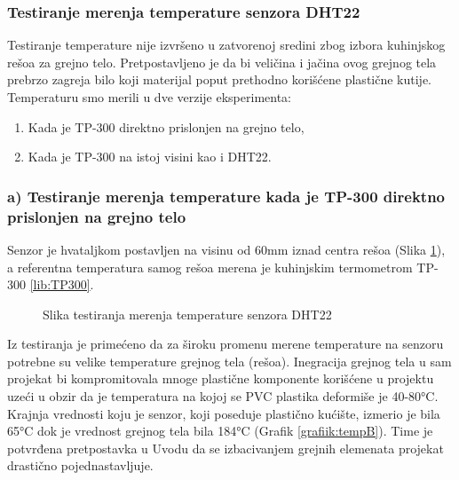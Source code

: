 \documentclass[a4paper, 12pt]{article}
\begin{document}
\pagebreak

		\subsubsection*{Testiranje merenja temperature senzora DHT22}

\vspace{10pt}		
		
Testiranje temperature nije izvršeno u zatvorenoj sredini zbog izbora kuhinjskog rešoa za grejno telo. Pretpostavljeno je da bi veličina i jačina ovog grejnog tela prebrzo zagreja bilo koji materijal poput prethodno korišćene plastične kutije. Temperaturu smo merili u dve verzije eksperimenta:
	
	\begin{enumerate}[label={\alph*)}]
		\item Kada je TP-300 direktno prislonjen na grejno telo,
		\item Kada je TP-300 na istoj visini kao i DHT22.
	\end{enumerate}


		\subsubsection*{a) Testiranje merenja temperature kada je TP-300 direktno prislonjen na grejno telo}

Senzor je hvataljkom postavljen na visinu od 60mm iznad centra rešoa (Slika \ref{fig:testTempA}), a referentna temperatura samog rešoa merena je kuhinjskim termometrom TP-300 \ref{lib:TP300}.

\vspace{10pt}

\begin{figure}[H]
\centering
{}
\caption{Slika testiranja merenja temperature senzora DHT22} \label{fig:testTempA}
\end{figure}

\pagebreak

Iz testiranja je primećeno da za široku promenu merene temperature na senzoru potrebne su velike temperature grejnog tela (rešoa). Inegracija grejnog tela u sam projekat bi kompromitovala mnoge plastične komponente korišćene u projektu uzeći u obzir da je temperatura na kojoj se PVC plastika deformiše je 40-80°C. Krajnja vrednosti koju je senzor, koji poseduje plastično kućište, izmerio je bila 65°C dok je vrednost grejnog tela bila 184°C (Grafik \ref{grafiik:tempB}). Time je potvrđena pretpostavka u Uvodu da se izbacivanjem grejnih elemenata projekat drastično pojednastavljuje. 
\end{document}
